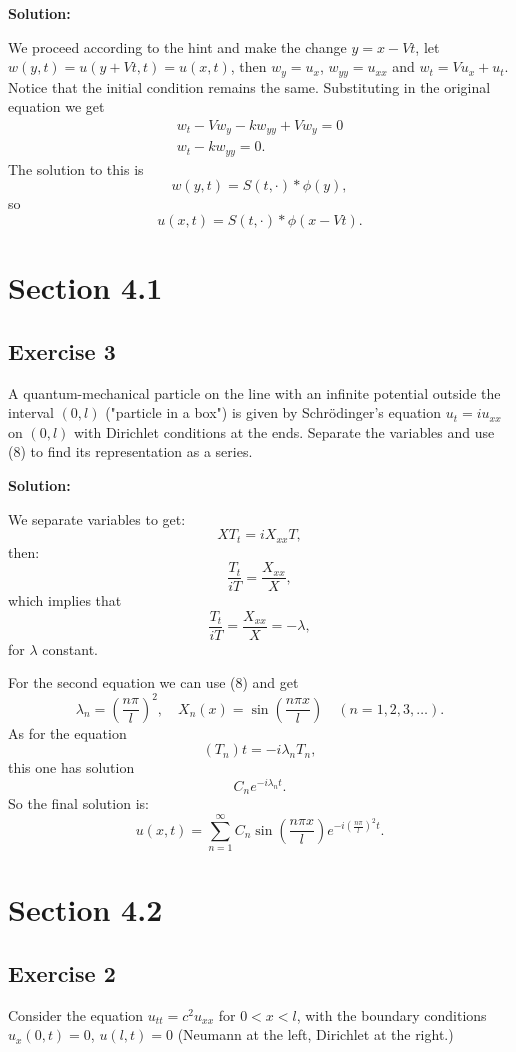 \documentclass{article}
\begin{document}
\textbf{Solution:}

We proceed according to the hint and make the change $y=x-Vt$, let
$w(y,t)=u(y+Vt,t)=u(x,t)$, then $w_y=u_x$, $w_{yy}=u_{xx}$ and $w_t=Vu_x+u_t$.
Notice that the initial condition remains the same.
Substituting in the original equation we get
\begin{align*}
w_t-Vw_y -kw_{yy}+Vw_y=0\\
w_t-kw_{yy}=0.
\end{align*}
The solution to this is
\[
    w(y,t)=S(t,\cdot)\ast \phi(y),
\]
so
\[
    u(x,t)=S(t,\cdot)\ast \phi(x-Vt).
\]
\section{Section 4.1}
\subsection{Exercise 3}
A quantum-mechanical particle on the line with an infinite potential outside
the interval $(0,l)$ ("particle in a box") is given by Schr\"odinger's equation
$u_t=iu_{xx}$ on $(0,l)$ with Dirichlet conditions at the ends. Separate the
variables and use (8) to find its representation as a series.

\textbf{Solution:}


We separate variables to get:
\[
    XT_t=iX_{xx}T,
\]
then:
\[
    \frac{T_t}{iT}=\frac{X_{xx}}{X},
\]
which implies that
\[
    \frac{T_t}{iT}=\frac{X_{xx}}{X}=-\lambda,
\]
for $\lambda$ constant.

For the second equation we can use (8) and get
\[
    \lambda_n=\left(\frac{n\pi}{l}\right)^2,\quad X_n(x)=\sin\left(\frac{n\pi
    x}{l}\right) \quad (n=1,2,3,\dots).
\]
As for the equation
\[
    (T_n)t=-i\lambda_n T_n,
\]
this one has solution
\[
    C_ne^{-i\lambda_nt}.
\]
So the final solution is:
\[
    u(x,t)=\sum_{n=1}^\infty C_n\sin\left(\frac{n\pi
    x}{l}\right)e^{-i\left(\frac{n\pi}{l}\right)^2t}.
\]
\section{Section 4.2}
\subsection{Exercise 2}
Consider the equation $u_{tt}=c^2u_{xx}$ for $0<x<l$, with the boundary
conditions $u_x(0,t)=0$, $u(l,t)=0$ (Neumann at the left, Dirichlet at the right.)
\end{document}
